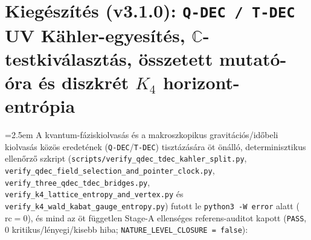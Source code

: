 \documentclass[11pt,a4paper]{article}
\begin{document}
\section{Kiegészítés (v3.1.0): \texttt{Q-DEC / T-DEC} UV K\"ahler-egyesítés, \texorpdfstring{$\mathbb{C}$}{C}-testkiválasztás, összetett mutató-óra és diszkrét \texorpdfstring{$K_4$}{K4} horizont-entrópia}
\label{sec:v31-qdec-tdec-hu}

{\emergencystretch=2.5em
A kvantum-fáziskiolvasás és a makroszkopikus gravitációs/időbeli kiolvasás közös eredetének (\texttt{Q-DEC}/\texttt{T-DEC}) tisztázására öt önálló, determinisztikus ellenőrző szkript (\texttt{scripts/\allowbreak verify\_\allowbreak qdec\_\allowbreak tdec\_\allowbreak kahler\_\allowbreak split.py}, \texttt{verify\_\allowbreak qdec\_\allowbreak field\_\allowbreak selection\_\allowbreak and\_\allowbreak pointer\_\allowbreak clock.py}, \texttt{verify\_\allowbreak three\_\allowbreak qdec\_\allowbreak tdec\_\allowbreak bridges.py}, \texttt{verify\_\allowbreak k4\_\allowbreak lattice\_\allowbreak entropy\_\allowbreak and\_\allowbreak vertex.py} és \texttt{verify\_\allowbreak k4\_\allowbreak wald\_\allowbreak kabat\_\allowbreak gauge\_\allowbreak entropy.py}) futott le \texttt{python3 -W error} alatt ($\mathrm{rc}=0$), és mind az öt független Stage-A ellenséges referens-auditot kapott (\texttt{PASS}, $0$ kritikus/lényegi/kisebb hiba; \texttt{NATURE\_\allowbreak LEVEL\_\allowbreak CLOSURE = false}):\par}
\end{document}
